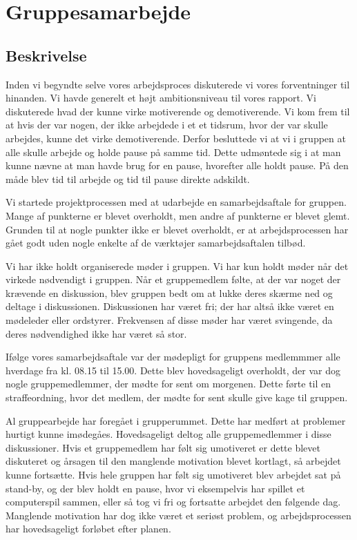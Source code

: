 \section{Gruppesamarbejde}
\subsection{Beskrivelse}
Inden vi begyndte selve vores arbejdsproces diskuterede vi vores forventninger til hinanden. Vi havde generelt et h\o{}jt ambitionsniveau til vores rapport. 
Vi diskuterede hvad der kunne virke motiverende og demotiverende. Vi kom frem til at hvis der var nogen, der ikke arbejdede i et et tidsrum, hvor der var skulle arbejdes, kunne det virke demotiverende.
Derfor besluttede vi at vi i gruppen at alle skulle arbejde og holde pause p\aa{} samme tid. Dette udm\o{}ntede sig i at man kunne n\ae{}vne at man havde brug for en pause, hvorefter alle holdt pause. 
P\aa{} den m\aa{}de blev tid til arbejde og tid til pause direkte adskildt.


Vi startede projektprocessen med at udarbejde en samarbejdsaftale for gruppen. Mange af punkterne er blevet overholdt, men andre af punkterne er blevet glemt. 
Grunden til at nogle punkter ikke er blevet overholdt, er at arbejdsprocessen har g\aa{}et godt uden nogle enkelte af de v\ae{}rkt\o{}jer samarbejdsaftalen tilb\o{}d.


Vi har ikke holdt organiserede m\o{}der i gruppen. Vi har kun holdt m\o{}der n\aa{}r det virkede n\o{}dvendigt i gruppen. 
N\aa{}r et gruppemedlem f\o{}lte, at der var noget der kr\ae{}vende en diskussion, blev gruppen bedt om at lukke deres sk\ae{}rme ned og deltage i diskussionen. 
Diskussionen har v\ae{}ret fri; der har alts\aa{} ikke v\ae{}ret en m\o{}deleder eller ordstyrer.
Frekvensen af disse m\o{}der har v\ae{}ret svingende, da deres n\o{}dvendighed ikke har v\ae{}ret s\aa{} stor.


If\o{}lge vores samarbejdsaftale var der m\o{}depligt for gruppens medlemmmer alle hverdage fra kl. 08.15 til 15.00. 
Dette blev hovedsageligt overholdt, der var dog nogle gruppemedlemmer, der m\o{}dte for sent om morgenen. 
Dette f\o{}rte til en straffeordning, hvor det medlem, der m\o{}dte for sent skulle give kage til gruppen. 


Al gruppearbejde har foreg\aa{}et i grupperummet. Dette har medf\o{}rt at problemer hurtigt kunne im\o{}deg\aa{}es. 
Hovedsageligt deltog alle gruppemedlemmer i disse diskussioner.
Hvis et gruppemedlem har f\o{}lt sig umotiveret er dette blevet diskuteret og \aa{}rsagen til den manglende motivation blevet kortlagt, s\aa{} arbejdet kunne forts\ae{}tte.
Hvis hele gruppen har f\o{}lt sig umotiveret blev arbejdet sat p\aa{} stand-by, og der blev holdt en pause, hvor vi eksempelvis har spillet et computerspil sammen, eller s\aa{} tog vi fri og fortsatte arbejdet den f\o{}lgende dag.
Manglende motivation har dog ikke v\ae{}ret et seri\o{}st problem, og arbejdsprocessen har hovedsageligt forl\o{}bet efter planen.


